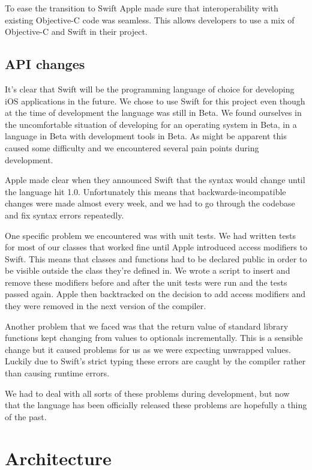 \documentclass[pdftex, DIV=calc, paper=a4, fontsize=11pt, twocolumn]{scrartcl}	 %
\begin{document}
To ease the transition to Swift Apple made sure that interoperability with existing Objective-C 
code was seamless. This allows developers to use a mix of Objective-C and Swift in their project.

\subsection*{API changes}

It's clear that Swift will be the programming language of choice for developing iOS applications
in the future. We chose to use Swift for this project even though at the time of development the
language was still in Beta. We found ourselves in the uncomfortable situation of developing for an
operating system in Beta, in a language in Beta with development tools in Beta. As might be apparent
this caused some difficulty and we encountered several pain points during development.

Apple made clear when they announced Swift that the syntax would change until the language hit 1.0.
Unfortunately this means that backwards-incompatible changes were made almost every week, and we had
to go through the codebase and fix syntax errors repeatedly.

One specific problem we encountered was with unit tests. We had written tests for most of our classes
that worked fine until Apple introduced access modifiers to Swift. This means that classes and 
functions had to be declared public in order to be visible outside the class they're defined in. We
wrote a script to insert and remove these modifiers before and after the unit tests were run and
the tests passed again. Apple then backtracked on the decision to add access modifiers and they were
removed in the next version of the compiler. 

Another problem that we faced was that the return value of standard library functions kept changing
from values to optionals incrementally. This is a sensible change but it caused problems for us as
we were expecting unwrapped values. Luckily due to Swift's strict typing these errors are caught by
the compiler rather than causing runtime errors.

We had to deal with all sorts of these problems during development, but now that the language has 
been officially released these problems are hopefully a thing of the past.

\section*{Architecture}
\end{document}
